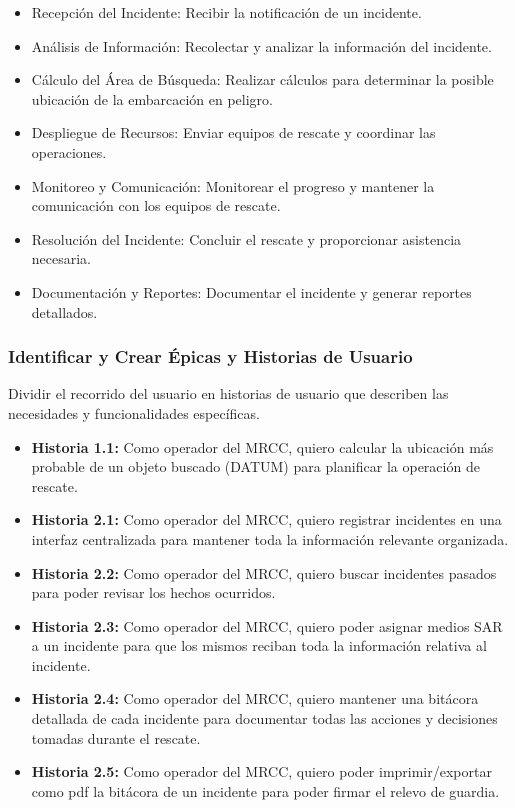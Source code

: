 \begin{itemize}
    \item Recepción del Incidente: Recibir la notificación de un incidente.
    \item Análisis de Información: Recolectar y analizar la información del incidente.
    \item Cálculo del Área de Búsqueda: Realizar cálculos para determinar la posible ubicación de la embarcación en peligro.
    \item Despliegue de Recursos: Enviar equipos de rescate y coordinar las operaciones.
    \item Monitoreo y Comunicación: Monitorear el progreso y mantener la comunicación con los equipos de rescate.
    \item Resolución del Incidente: Concluir el rescate y proporcionar asistencia necesaria.
    \item Documentación y Reportes: Documentar el incidente y generar reportes detallados.
\end{itemize}


\subsubsection{Identificar y Crear Épicas y Historias de Usuario}

Dividir el recorrido del usuario en historias de usuario que describen las necesidades y funcionalidades específicas.

\begin{itemize}
    \item \textbf{Historia 1.1:} Como operador del MRCC, quiero calcular la ubicación más probable de un objeto buscado (DATUM) para planificar la operación de rescate.
\end{itemize}


\begin{itemize}
    \item \textbf{Historia 2.1:} Como operador del MRCC, quiero registrar incidentes en una interfaz centralizada para mantener 
    toda la información relevante organizada.
    \item \textbf{Historia 2.2:} Como operador del MRCC, quiero buscar incidentes pasados para poder revisar los hechos ocurridos.
    \item \textbf{Historia 2.3:} Como operador del MRCC, quiero poder asignar medios SAR a un incidente para que los mismos reciban 
    toda la información relativa al incidente.
    \item \textbf{Historia 2.4:} Como operador del MRCC, quiero mantener una bitácora detallada de cada incidente para documentar 
    todas las acciones y decisiones tomadas durante el rescate.
    \item \textbf{Historia 2.5:} Como operador del MRCC, quiero poder imprimir/exportar como pdf la bitácora de un incidente para 
    poder firmar el relevo de guardia.
\end{itemize}

